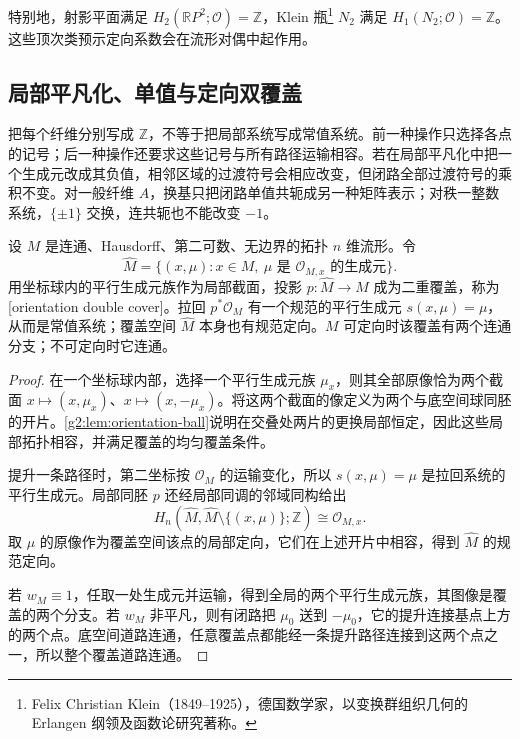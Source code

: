 \ProseParagraphBreak

特别地，射影平面满足 \(H_2(\mathbb RP^2;\mathcal O)=\mathbb Z\)，Klein 瓶\footnote{Felix Christian Klein（1849--1925），德国数学家，以变换群组织几何的 Erlangen 纲领及函数论研究著称。} \(N_2\) 满足 \(H_1(N_2;\mathcal O)=\mathbb Z\)。这些顶次类预示定向系数会在流形对偶中起作用。

\subsection{局部平凡化、单值与定向双覆盖}
\label{g2:subsec:0503:04}
把每个纤维分别写成 \(\mathbb Z\)，不等于把局部系统写成常值系统。前一种操作只选择各点的记号；后一种操作还要求这些记号与所有路径运输相容。若在局部平凡化中把一个生成元改成其负值，相邻区域的过渡符号会相应改变，但闭路全部过渡符号的乘积不变。对一般纤维 \(A\)，换基只把闭路单值共轭成另一种矩阵表示；对秩一整数系统，\(\{\pm1\}\) 交换，连共轭也不能改变 \( -1\)。

\begin{proposition}\label{g2:prop:orientation-double-cover}
	设 \(M\) 是连通、Hausdorff、第二可数、无边界的拓扑 \(n\) 维流形。令
	\[
		\widehat M=\{(x,\mu):x\in M,\ \mu\text{ 是 }\mathcal O_{M,x}\text{ 的生成元}\}.
	\]
	用坐标球内的平行生成元族作为局部截面，投影 \(p:\widehat M\to M\) 成为二重覆盖，称为[orientation double cover]。拉回 \(p^*\mathcal O_M\) 有一个规范的平行生成元 \(s(x,\mu)=\mu\)，从而是常值系统；覆盖空间 \(\widehat M\) 本身也有规范定向。\(M\) 可定向时该覆盖有两个连通分支；不可定向时它连通。
\end{proposition}
\begin{proof}
	在一个坐标球内部，选择一个平行生成元族 \(\mu_x\)，则其全部原像恰为两个截面 \(x\mapsto(x,\mu_x)\)、\(x\mapsto(x,-\mu_x)\)。将这两个截面的像定义为两个与底空间球同胚的开片。\cref{g2:lem:orientation-ball}说明在交叠处两片的更换局部恒定，因此这些局部拓扑相容，并满足覆盖的均匀覆盖条件。

	提升一条路径时，第二坐标按 \(\mathcal O_M\) 的运输变化，所以 \(s(x,\mu)=\mu\) 是拉回系统的平行生成元。局部同胚 \(p\) 还经局部同调的邻域同构给出
	\[
		H_n(\widehat M,\widehat M\setminus\{(x,\mu)\};\mathbb Z)\cong\mathcal O_{M,x}.
	\]
	取 \(\mu\) 的原像作为覆盖空间该点的局部定向，它们在上述开片中相容，得到 \(\widehat M\) 的规范定向。

	若 \(w_M\equiv1\)，任取一处生成元并运输，得到全局的两个平行生成元族，其图像是覆盖的两个分支。若 \(w_M\) 非平凡，则有闭路把 \(\mu_0\) 送到 \( -\mu_0\)，它的提升连接基点上方的两个点。底空间道路连通，任意覆盖点都能经一条提升路径连接到这两个点之一，所以整个覆盖道路连通。
\end{proof}

